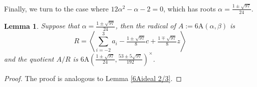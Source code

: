 \documentclass[11pt, a4paper]{article}
\theoremstyle{plain}
\newtheorem{lemma}[theorem]{Lemma}
\theoremstyle{definition}
\newcommand\al{\alpha}
\newcommand\bt{\beta}
\newcommand\la{\langle}
\newcommand\ra{\rangle}
\DeclareMathOperator{\Ann}{Ann}
\newcommand{\A}{\mathrm{A}}
\newcommand{\0}{\overline{0}}
\newcommand{\2}{\overline{2}}
\newcommand{\1}{\mathbbm{1}}
\begin{document}
Finally, we turn to the case where $12\al^2-\al-2=0$, which has roots $\al = \frac{1 \pm \sqrt{97}}{24}$.

\begin{lemma}
Suppose that $\al = \frac{1 \pm \sqrt{97}}{24}$, then the radical of $A := 6\A(\al, \bt)$ is
\[
R = \left\la \sum_{i=-2}^{3}a_i - \tfrac{1\pm \sqrt{97}}{8}c + \tfrac{1\mp \sqrt{97}}{8}z \right\ra
\]
and the quotient $A/R$ is $6\A(\frac{1\pm \sqrt{97}}{24}, \frac{53 \pm 5\sqrt{97}}{192} )^\times$.
\end{lemma}

\begin{proof}
The proof is analogous to Lemma \ref{6Aideal 2/3}.
\end{proof}
\end{document}
